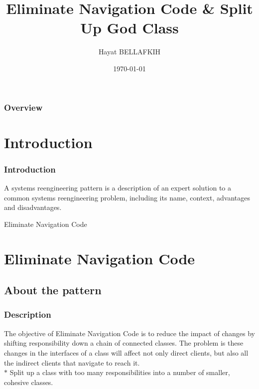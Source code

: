 \documentclass{beamer}
\title[Redistribute Responsibilities]{Eliminate Navigation Code \& Split Up God Class} %
\author{Hayat BELLAFKIH} %
\institute[UMONS] %
{
University of Mons\\ %
\medskip
\textit{hayat.BELLAFKIH@student.umons.ac.be} %
}
\date{\today} %
\begin{document}
\begin{frame}
\titlepage %
\end{frame}

\begin{frame}
\frametitle{Overview} %
\tableofcontents %
\end{frame}


\section{Introduction} 
\begin{frame}
\frametitle{Introduction}
A systems reengineering pattern is a description of an expert solution to a common systems reengineering problem, including its name, context, advantages and disadvantages.
\end{frame}
\begin{center}
\begin{frame}
Eliminate Navigation Code
\end{frame}
\end{center}
\section{Eliminate Navigation Code}
\subsection{About the pattern}
\begin{frame}
\frametitle{Description}

The objective of Eliminate Navigation Code is to reduce the impact of changes by shifting responsibility down a chain of connected classes. The problem is these changes in the interfaces of a class will affect not only direct clients, but also all the indirect clients that navigate to reach it. \\ 
\setlength{\parskip}{10pt plus 1pt minus 1pt}
$\ast$ Split up a class with too many responsibilities into a number of smaller, cohesive classes.
\end{frame}
\end{document}
